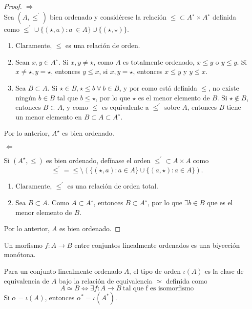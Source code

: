 \begin{proof}
    $\Rightarrow$\\
    Sea $(A,\leq^{\prime})$ bien ordenado y considérese la relación $\leq\subset A^\star\times A^\star$ definida como $\leq^{\prime} \cup \{(\star,a):a \ \in A\}\cup \{(\star,\star)\}$. 
    \begin{enumerate}
        \item Claramente, $\leq$ es una relación de orden.
        \item Sean $x,y\in A^\star$. Si $x,y \neq \star$, como $A$ es totalmente ordenado, $x\leq y$ o $y\leq y$. Si $x\neq \star, y=\star$, entonces $y\leq x$,  si $x,y=\star$, entonces $x\leq y $ y $y\leq x$.
        \item Sea $B\subset A$. Si $\star\in B, \star\leq b \ \forall \ b\in B$, y por como está definida $\leq$, no existe ningún $b\in B$ tal que $b\leq \star$, por lo que $\star$ es el menor elemento de $B$.
        Si $\star\not\in B$, entonces $B\subset A$, y como $\leq$ es equivalente a $\leq^{\prime}$ sobre $A$, entonces $B$ tiene un menor elemento en $B\subset A \subset A^\star$.
    \end{enumerate}
    Por lo anterior, $A^\star$ es bien ordenado.\vspace{3mm}
    
    $\Leftarrow$\vspace{3mm}
    
    Si $(A^\star,\leq)$ es bien ordenado, defínase el orden $\leq^{\prime}\subset A\times A$ como
    \[
        \leq^{\prime}=\leq\setminus \left( \{(\star,a):a\in A\} \cup \{(a,\star):a\in A\}\right)
    .\]
    \begin{enumerate}
        \item Claramente, $\leq^{\prime} $ es una relación de orden total.
        \item Sea $B\subset A$. Como $A\subset A^\star$, entonces $B\subset A^\star$, por lo que $\exists b\in B$ que es el menor elemento de $B$.
    \end{enumerate}
    Por lo anterior, $A$ es bien ordenado.
\end{proof}
\begin{definition}
Un morfismo $f:A\to B$ entre conjuntos linealmente ordenados es una biyección monótona.
\end{definition}
\begin{definition}
  Para un conjunto linealmente ordenado $A$, el tipo de orden $\iota(A)$ es la clase de equivalencia de $A$ bajo la relación de equivalencia $\simeq$ definida como
  $$A\simeq B \iff \exists f: A\to B \ \text{tal que f es isomorfismo}$$
  Si $\alpha=\iota(A)$, entonces $\alpha^*=\iota(A^*)$.
\end{definition}
